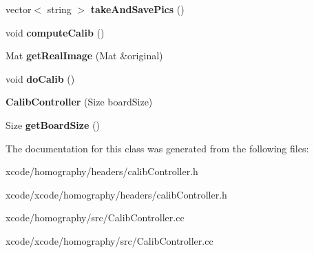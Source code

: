 \begin{DoxyCompactItemize}
\item 
\hypertarget{class_calib_controller_a98f63965152d1f337c55bd1584eb4cb3}{vector$<$ string $>$ {\bfseries take\-And\-Save\-Pics} ()}\label{class_calib_controller_a98f63965152d1f337c55bd1584eb4cb3}

\item 
\hypertarget{class_calib_controller_a1e4505d8fd2f7ce275fec12a10e1c591}{void {\bfseries compute\-Calib} ()}\label{class_calib_controller_a1e4505d8fd2f7ce275fec12a10e1c591}

\item 
\hypertarget{class_calib_controller_a01093e8a1e478e536dafdba833b24d57}{Mat {\bfseries get\-Real\-Image} (Mat \&original)}\label{class_calib_controller_a01093e8a1e478e536dafdba833b24d57}

\item 
\hypertarget{class_calib_controller_ab5118d61dbbb24ca2b88713f56666540}{void {\bfseries do\-Calib} ()}\label{class_calib_controller_ab5118d61dbbb24ca2b88713f56666540}

\item 
\hypertarget{class_calib_controller_a927ad2def953ee2f7f7e6819d73352d7}{{\bfseries Calib\-Controller} (Size board\-Size)}\label{class_calib_controller_a927ad2def953ee2f7f7e6819d73352d7}

\item 
\hypertarget{class_calib_controller_ad5f91606cb01ac9ee3da9c8dfc90495c}{Size {\bfseries get\-Board\-Size} ()}\label{class_calib_controller_ad5f91606cb01ac9ee3da9c8dfc90495c}

\end{DoxyCompactItemize}


The documentation for this class was generated from the following files\-:\begin{DoxyCompactItemize}
\item 
xcode/homography/headers/calib\-Controller.\-h\item 
xcode/xcode/homography/headers/calib\-Controller.\-h\item 
xcode/homography/src/Calib\-Controller.\-cc\item 
xcode/xcode/homography/src/Calib\-Controller.\-cc\end{DoxyCompactItemize}
